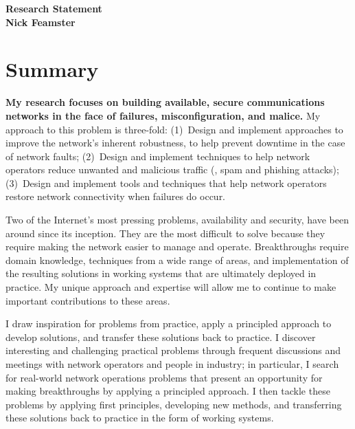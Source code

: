 
\newpage \setcounter{page}{1}

\begin{center}
{\Large\textbf{Research Statement}}\\[0.1in] {\large\textbf{Nick
Feamster}}\\
\end{center}


\section*{Summary}

{\bf My research focuses on building available, secure communications
 networks in the face of failures, misconfiguration, and malice.}  My
 approach to this problem is three-fold: (1)~Design and implement
 approaches to improve the network's inherent robustness, to help
 prevent downtime in the case of network faults; (2)~Design and
 implement techniques to help network operators reduce unwanted and
 malicious traffic (\eg, spam and phishing attacks); (3)~Design and
 implement tools and techniques that help network operators restore
 network connectivity when failures do occur.

Two of the Internet's most pressing problems, availability and security,
have been around since its inception.  They are the most difficult to
solve because they require making the network easier to manage and
operate.  Breakthroughs require domain knowledge, techniques from a wide
range of areas, and implementation of the resulting solutions in working
systems that are ultimately deployed in practice.  My unique approach
and expertise will allow me to continue to make important contributions
to these areas.

I draw inspiration for problems from practice, apply a principled
approach to develop solutions, and transfer these solutions back to
practice.  I discover interesting and challenging practical problems
through frequent discussions and meetings with network operators and
people in industry; in particular, I search for real-world network
operations problems that present an opportunity for making breakthroughs
by applying a principled approach.  I then tackle these problems by
applying first principles, developing new methods, and transferring
these solutions back to practice in the form of working systems.

